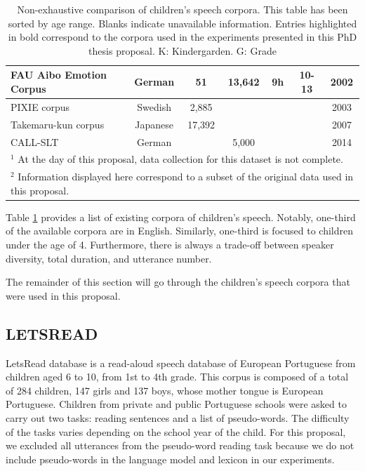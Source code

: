 \begin{table}
\begin{tabular}{l|c|c|c|c|c|c}
\hline
FAU Aibo Emotion Corpus \cite{steidl2009automatic} & German & 51 & 13,642 & 9h & 10-13 & 2002 \\ 
\hline
PIXIE corpus \cite{bell2003child} & Swedish & 2,885 &  &  &  & 2003 \\ 
\hline
Takemaru-kun corpus \cite{takemaru} & Japanese & 17,392 &  &  & & 2007 \\ 
\hline
CALL-SLT \cite{callslt} & German &  & 5,000 &  &  & 2014 \\ 
\hline
\multicolumn{7}{l}{$^1$ At the day of this proposal, data collection for this dataset is not complete.} \\
\multicolumn{7}{l}{$^2$ Information displayed here correspond to a subset of the original data used in this proposal.}  \\
\end{tabular}
\caption{Non-exhaustive comparison of children's speech corpora. This table has been sorted by age range. Blanks indicate unavailable information. Entries highlighted in bold correspond to the corpora used in the experiments presented in this PhD thesis proposal. K: Kindergarden. G: Grade}
\label{table:children_corpora}
\end{table}
Table \ref{table:children_corpora} provides a list of existing corpora of children's speech. Notably, one-third of the available corpora are in English. Similarly, one-third is focused to children under the age of 4. Furthermore, there is always a trade-off between speaker diversity, total duration, and utterance number.

The remainder of this section will go through the children's speech corpora that were used in this proposal.

\subsection{LETSREAD}
LetsRead database \cite{letsread} is a read-aloud speech database of European Portuguese from children aged 6 to 10,  from 1st to 4th grade. This corpus is composed of a total of 284 children, 147 girls and 137 boys, whose mother tongue is European Portuguese. Children from private and public Portuguese schools were asked to carry out two tasks: reading sentences and a list of pseudo-words. The difficulty of the tasks varies depending on the school year of the child. 
For this proposal, we excluded all utterances from the pseudo-word reading task because we do not include pseudo-words in the language model and lexicon in our experiments. 
